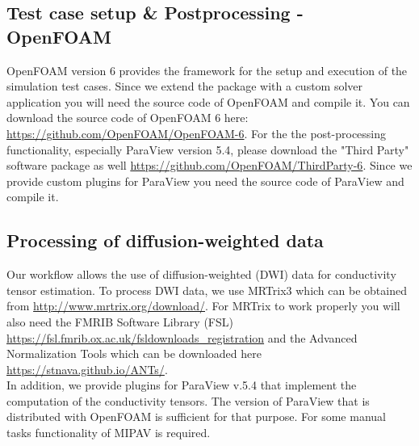 \subsection{Test case setup \& Postprocessing - OpenFOAM}
OpenFOAM version 6 provides the framework for the setup and execution of the simulation test cases. Since we extend the package
with a custom solver application you will need the source code of OpenFOAM and compile it. You can download the source code of
OpenFOAM 6 here: \url{https://github.com/OpenFOAM/OpenFOAM-6}. For the the post-processing functionality, especially ParaView
version 5.4, please download the "Third Party" software package as well \url{https://github.com/OpenFOAM/ThirdParty-6}. Since we
provide custom plugins for ParaView you need the source code of ParaView and compile it.

\subsection{Processing of diffusion-weighted data}
Our workflow allows the use of diffusion-weighted (DWI) data for conductivity tensor estimation. To process DWI data, we use
MRTrix3 which can be obtained from \url{http://www.mrtrix.org/download/}. For MRTrix to work properly you will also need
the FMRIB Software Library (FSL) \url{https://fsl.fmrib.ox.ac.uk/fsldownloads\_registration} and the Advanced Normalization Tools
which can be downloaded here \url{https://stnava.github.io/ANTs/}.\\
In addition, we provide plugins for ParaView v.5.4 that implement the computation of the conductivity tensors. The version of
ParaView that is distributed with OpenFOAM is sufficient for that purpose. For some manual tasks functionality of MIPAV is required.


